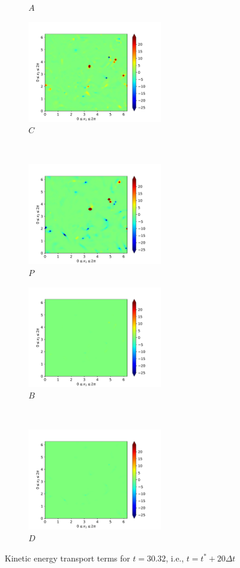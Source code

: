 \begin{figure}[H]
\begin{subfigure}{0.45\textwidth}
        \caption{$A$}
    \end{subfigure}
    \newline
    \begin{subfigure}{0.45\textwidth}
        \includegraphics[height=1.75in]{media/run-cds-65/C-ke-1360}
        \caption{$C$}
    \end{subfigure}
    ~
    \begin{subfigure}{0.45\textwidth}
        \includegraphics[height=1.75in]{media/run-cds-65/P-ke-1360}
        \caption{$P$}
    \end{subfigure}
    \newline
    \begin{subfigure}{0.45\textwidth}
        \includegraphics[height=1.75in]{media/run-cds-65/B-ke-1360}
        \caption{$B$}
    \end{subfigure}
    ~
    \begin{subfigure}{0.45\textwidth}
        \includegraphics[height=1.75in]{media/run-cds-65/D-ke-1360}
        \caption{$D$}
    \end{subfigure}
    \caption{Kinetic energy transport terms for $t=30.32$, i.e., $t=t^{\ast} + 20 \Delta t$}
\end{figure}


